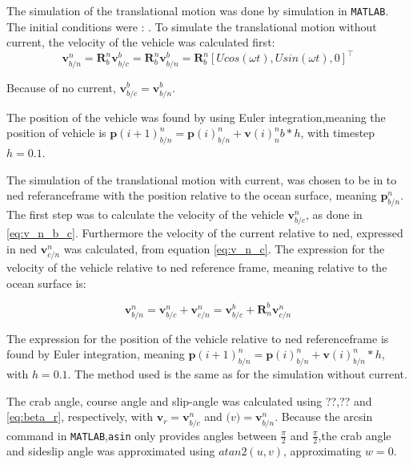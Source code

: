 The simulation of the translational motion was done by simulation in \texttt{MATLAB}. The initial conditions were : . To simulate the translational motion without current, the velocity of the vehicle was calculated first:
\begin{equation}
    \mathbf{v}^n_{b/n} = \mathbf{R}^n_b \mathbf{v}^b_{b/c} =\mathbf{R}^n_b \mathbf{v}^b_{b/n} = \mathbf{R}^n_b [U cos(\omega t), U sin(\omega t), 0]^\top
    \label{eq:v_n_b_c}
\end{equation}

Because of no current, $\mathbf{v}^b_{b/c} = \mathbf{v}^b_{b/n}$.

The position of the vehicle was found by using Euler integration,meaning the position of vehicle is $\mathbf{p}(i+1)^n_{b/n} = \mathbf{p}(i)^n_{b/n} + \mathbf{v}(i)^n_{n}b*h $, with timestep $h = 0.1$.
 
The  simulation of the translational motion with current, was chosen to be in to ned referanceframe with the position relative to the ocean surface, meaning $\mathbf{p}^n_{b/n}$. The first step was to calculate the velocity of the vehicle $\mathbf{v}^n_{b/c}$, as done in \eqref{eq:v_n_b_c}. Furthermore the velocity of the current relative to ned, expressed in ned $\mathbf{v}^n_{c/n}$ was calculated, from equation \eqref{eq:v_n_c}. The expression for the velocity of the vehicle relative to ned reference frame, meaning  relative to the ocean surface is:


\begin{equation}
    \mathbf{v}^n_{b/n} = \mathbf{v}^n_{b/c} + \mathbf{v}^n_{c/n} =  \boldsymbol{v}^b_{b/c} + \mathbf{R}^b_n \boldsymbol{v}^{n}_{c/n} 
    \label{eq:v_b_r}
\end{equation}

The expression for the position of the vehicle relative to ned referenceframe  is found by Euler integration, meaning $\mathbf{p}(i+1)^n_{b/n} = \mathbf{p}(i)^n_{b/n} + \mathbf{v}(i)^n_{b/n}*h $, with $h = 0.1$. The method used is the same as for the simulation without current.


The crab angle, course angle and slip-angle was calculated using ??,?? and \eqref{eq:beta_r}, respectively, with $\mathbf{v}_r = \mathbf{v}^n_{b/c}$ and $\mathbf(v) = \mathbf{v}^n_{b/n}$.  Because the arcsin command in \texttt{MATLAB},\texttt{asin} only provides angles between $\frac{\pi}{2}$ and $\frac{\pi}{2}$,the crab angle and sideslip angle was approximated using $atan2(u,v)$, approximating $w= 0$.




